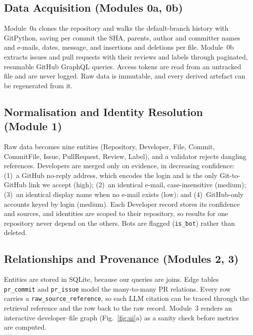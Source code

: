 \documentclass[conference]{IEEEtran}
\newcommand{\code}[1]{\texttt{\small #1}}
\begin{document}
\subsection{Data Acquisition (Modules 0a, 0b)}
Module~0a clones the repository and walks the default-branch history with GitPython, saving per commit the SHA, parents, author and committer names and e-mails, dates, message, and insertions and deletions per file. Module~0b extracts issues and pull requests with their reviews and labels through paginated, resumable GitHub GraphQL queries. Access tokens are read from an untracked file and are never logged. Raw data is immutable, and every derived artefact can be regenerated from it.

\subsection{Normalisation and Identity Resolution (Module 1)}
Raw data becomes nine entities (Repository, Developer, File, Commit, CommitFile, Issue, PullRequest, Review, Label), and a validator rejects dangling references. Developers are merged only on evidence, in decreasing confidence: (1)~a GitHub no-reply address, which encodes the login and is the only Git-to-GitHub link we accept (high); (2)~an identical e-mail, case-insensitive (medium); (3)~an identical display name when no e-mail exists (low); and (4)~GitHub-only accounts keyed by login (medium). Each Developer record stores its confidence and sources, and identities are scoped to their repository, so results for one repository never depend on the others. Bots are flagged (\code{is\_bot}) rather than deleted.

\subsection{Relationships and Provenance (Modules 2, 3)}
Entities are stored in SQLite, because our queries are joins. Edge tables \code{pr\_commit} and \code{pr\_issue} model the many-to-many PR relations. Every row carries a \code{raw\_source\_reference}, so each LLM citation can be traced through the retrieval reference and the row back to the raw record. Module~3 renders an interactive developer--file graph (Fig.~\ref{fig:ui}a) as a sanity check before metrics are computed.
\end{document}
